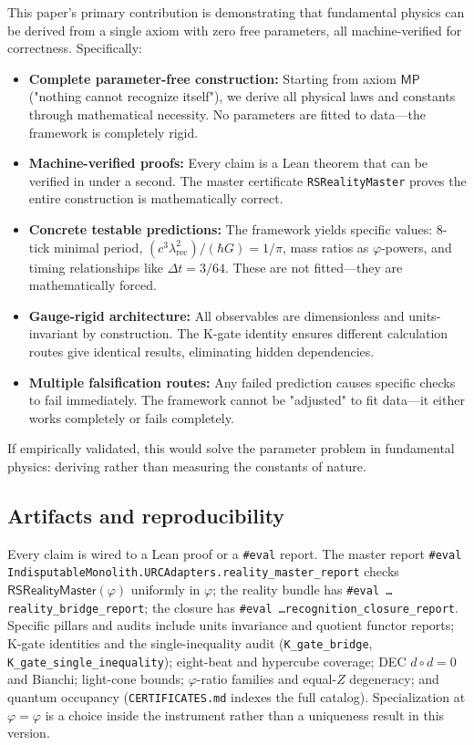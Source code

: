 \documentclass[11pt,a4paper,twoside]{article}
\numberwithin{equation}{section}
\newcommand{\phigr}{\varphi} %
\renewcommand{\phi}{\varphi}
\theoremstyle{customthm}
\theoremstyle{customdef}
\theoremstyle{customrem}
\begin{document}
This paper's primary contribution is demonstrating that fundamental physics can be derived from a single axiom with zero free parameters, all machine-verified for correctness. Specifically:
\begin{itemize}
  \item \textbf{Complete parameter-free construction:} Starting from axiom \(\mathsf{MP}\) ("nothing cannot recognize itself"), we derive all physical laws and constants through mathematical necessity. No parameters are fitted to data—the framework is completely rigid.
  \item \textbf{Machine-verified proofs:} Every claim is a Lean theorem that can be verified in under a second. The master certificate \texttt{RSRealityMaster} proves the entire construction is mathematically correct.
  \item \textbf{Concrete testable predictions:} The framework yields specific values: 8-tick minimal period, $(c^3\lambda_{\mathrm{rec}}^2)/(\hbar G) = 1/\pi$, mass ratios as $\varphi$-powers, and timing relationships like $\Delta t = 3/64$. These are not fitted—they are mathematically forced.
  \item \textbf{Gauge-rigid architecture:} All observables are dimensionless and units-invariant by construction. The K-gate identity ensures different calculation routes give identical results, eliminating hidden dependencies.
  \item \textbf{Multiple falsification routes:} Any failed prediction causes specific checks to fail immediately. The framework cannot be "adjusted" to fit data—it either works completely or fails completely.
\end{itemize}
If empirically validated, this would solve the parameter problem in fundamental physics: deriving rather than measuring the constants of nature.

\subsection{Artifacts and reproducibility}

Every claim is wired to a Lean proof or a \texttt{\#eval} report. The master report \texttt{\#eval IndisputableMonolith.URCAdapters.reality\_master\_report} checks \(\mathsf{RSRealityMaster}(\phi)\) uniformly in $\phi$; the reality bundle has \texttt{\#eval \dots reality\_bridge\_report}; the closure has \texttt{\#eval \dots recognition\_closure\_report}. Specific pillars and audits include units invariance and quotient functor reports; K-gate identities and the single-inequality audit (\texttt{K\_gate\_bridge}, \texttt{K\_gate\_single\_inequality}); eight-beat and hypercube coverage; DEC \(d\circ d=0\) and Bianchi; light-cone bounds; $\varphi$-ratio families and equal-\(Z\) degeneracy; and quantum occupancy (\texttt{CERTIFICATES.md} indexes the full catalog). Specialization at $\varphi=\phigr$ is a choice inside the instrument rather than a uniqueness result in this version.
\end{document}
